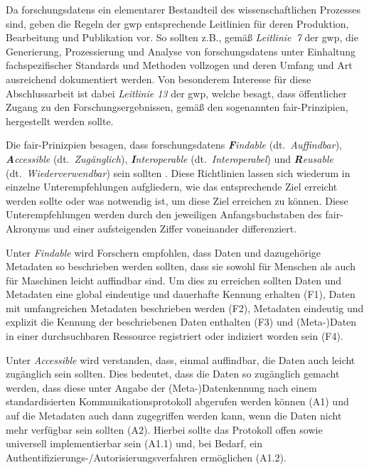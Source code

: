 Da \glspl{forschungsdaten} ein elementarer Bestandteil des wissenschaftlichen Prozesses sind, geben die Regeln der \gls{gwp} entsprechende Leitlinien für deren Produktion, Bearbeitung und Publikation vor.
So sollten z.B., gemäß \textit{Leitlinie~7} der \gls{gwp}, die Generierung, Prozessierung und Analyse von \glspl{forschungsdaten} unter Einhaltung fachspezifischer Standards und Methoden vollzogen und deren Umfang und Art ausreichend dokumentiert werden.
Von besonderem Interesse für diese Abschlussarbeit ist dabei \textit{Leitlinie 13} der \gls{gwp}, welche besagt, dass öffentlicher Zugang zu den Forschungsergebnissen, gemäß den sogenannten \gls{fair}-Prinzipien, hergestellt werden sollte.

Die \gls{fair}-Prinizpien besagen, dass \glspl{forschungsdaten} \textit{\textbf{F}indable} (dt.~\textit{Auffindbar}), \textit{\textbf{A}ccessible} (dt.~\textit{Zugänglich}), \textit{\textbf{I}nteroperable} (dt.~\textit{Interoperabel}) und \textit {\textbf{R}eusable} (dt.~\textit{Wiederverwendbar}) sein sollten \autocite{Wilkinson2016}.
Diese Richtlinien lassen sich wiederum in einzelne Unterempfehlungen aufgliedern, wie das entsprechende Ziel erreicht werden sollte oder was notwendig ist, um diese Ziel erreichen zu können.
Diese Unterempfehlungen werden durch den jeweiligen Anfangsbuchstaben des \gls{fair}-Akronyms und einer aufsteigenden Ziffer voneinander differenziert.

Unter \textit{Findable} wird Forschern empfohlen, dass Daten und dazugehörige Metadaten so beschrieben werden sollten, dass sie sowohl für Menschen als auch für Maschinen leicht auffindbar sind.
Um dies zu erreichen sollten Daten und Metadaten eine global eindeutige und dauerhafte Kennung erhalten (F1), Daten mit umfangreichen Metadaten beschrieben werden (F2), Metadaten eindeutig und explizit die Kennung der beschriebenen Daten enthalten (F3) und (Meta-)Daten in einer durchsuchbaren Ressource registriert oder indiziert worden sein (F4).

Unter \textit{Accessible} wird verstanden, dass, einmal auffindbar, die Daten auch leicht zugänglich sein sollten.
Dies bedeutet, dass die Daten so zugänglich gemacht werden, dass diese unter Angabe der (Meta-)Datenkennung nach einem standardisierten Kommunikationsprotokoll abgerufen werden können (A1) und auf die Metadaten auch dann zugegriffen werden kann, wenn die Daten nicht mehr verfügbar sein sollten (A2).
Hierbei sollte das Protokoll offen sowie universell implementierbar sein (A1.1) und, bei Bedarf, ein Authentifizierungs-/Autorisierungsverfahren ermöglichen (A1.2).

